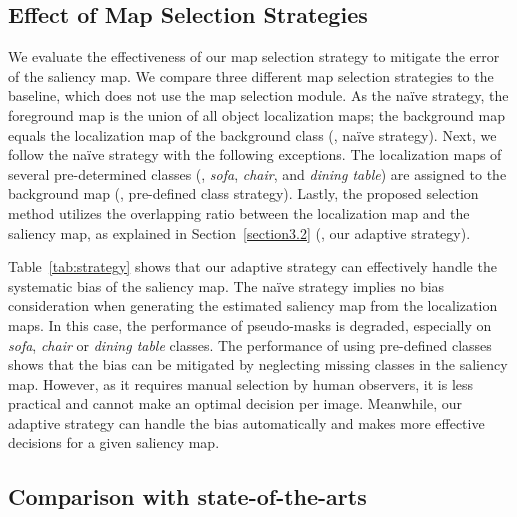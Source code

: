 \documentclass[final]{cvpr}
\begin{document}



\subsection{Effect of Map Selection Strategies}
We evaluate the effectiveness of our map selection strategy to mitigate the error of the saliency map. We compare three different map selection strategies to the baseline, which does not use the map selection module. As the na\"ive strategy, the foreground map is the union of all object localization maps; the background map equals the localization map of the background class (\ie, na\"ive strategy). Next, we follow the na\"ive strategy with the following exceptions. The localization maps of several pre-determined classes (\eg, \emph{sofa}, \emph{chair}, and \emph{dining table}) are assigned to the background map (\ie, pre-defined class strategy). Lastly, the proposed selection method utilizes the overlapping ratio between the localization map and the saliency map, as explained in Section~\ref{section3.2} (\ie, our adaptive strategy).




Table~\ref{tab:strategy} shows that our adaptive strategy can effectively handle the systematic bias of the saliency map. The na\"ive strategy implies no bias consideration when generating the estimated saliency map from the localization maps. In this case, the performance of pseudo-masks is degraded, especially on \emph{sofa}, \emph{chair} or \emph{dining table} classes. The performance of using pre-defined classes shows that the bias can be mitigated by neglecting missing classes in the saliency map. However, as it requires manual selection by human observers, it is less practical and cannot make an optimal decision per image. Meanwhile, our adaptive strategy can handle the bias automatically and makes more effective decisions for a given saliency map. 

\subsection{Comparison with state-of-the-arts}
\label{section5.3}
\end{document}
